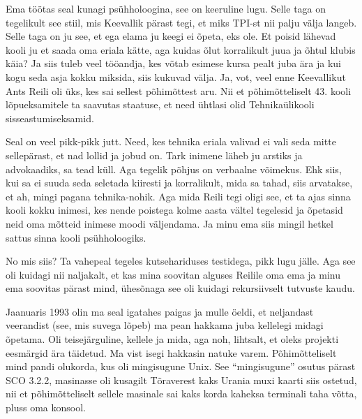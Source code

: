 
Ema töötas seal kunagi psühholoogina, see on keeruline lugu. Selle taga on tegelikult see stiil, mis  Keevallik pärast tegi, et miks TPI-st nii palju välja langeb. Selle taga on ju see, et ega elama ju keegi ei õpeta, eks ole. Et poisid lähevad  kooli ju et saada oma eriala kätte, aga kuidas õlut korralikult juua ja õhtul klubis käia? Ja siis tuleb  veel tööandja, kes võtab esimese kursa pealt juba ära ja kui kogu seda asja kokku miksida, siis kukuvad välja. Ja, vot, veel enne Keevallikut Ants Reili oli üks, kes sai sellest põhimõttest aru. Nii et põhimõtteliselt 43. kooli lõpueksamitele ta saavutas staatuse, et need ühtlasi olid Tehnikaülikooli sisseastumiseksamid. 

Seal on veel pikk-pikk jutt. Need, kes tehnika eriala valivad ei vali seda mitte sellepärast, et nad lollid ja jobud on. Tark inimene läheb ju arstiks ja advokaadiks, sa tead küll. Aga tegelik põhjus on verbaalne võimekus. Ehk siis, kui sa ei suuda seda seletada kiiresti ja korralikult, mida sa tahad, siis arvatakse, et ah, mingi pagana tehnika-nohik. Aga mida Reili tegi oligi see, et ta ajas sinna kooli kokku inimesi, kes nende poistega kolme aasta vältel tegelesid ja õpetasid neid oma mõtteid inimese moodi väljendama. Ja minu ema siis mingil hetkel sattus sinna kooli psühholoogiks. 


No mis siis? Ta vahepeal tegeles kutsehariduses testidega, pikk lugu jälle. Aga see oli kuidagi nii naljakalt, et kas mina soovitan alguses Reilile oma ema ja minu ema soovitas pärast mind, ühesõnaga see oli kuidagi rekursiivselt tutvuste kaudu. 

Jaanuaris 1993 olin ma seal igatahes paigas ja mulle öeldi, et neljandast veerandist (see, mis suvega lõpeb) ma pean hakkama juba kellelegi midagi õpetama. Oli teisejärguline, kellele ja mida, aga noh, lihtsalt, et oleks projekti eesmärgid ära täidetud. Ma vist isegi hakkasin natuke varem. Põhimõtteliselt mind pandi olukorda, kus oli mingisugune Unix. See \enquote{mingisugune} osutus pärast SCO 3.2.2, masinasse oli kusagilt Tõraverest kaks Urania muxi kaarti siis ostetud, nii et põhimõtteliselt sellele masinale sai kaks korda kaheksa terminali taha võtta, pluss oma konsool.  

